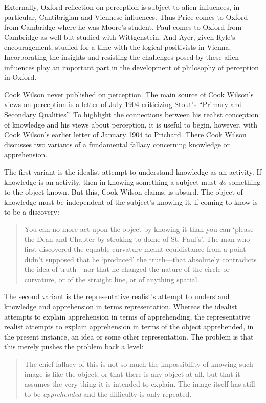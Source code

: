 \documentclass[11pt]{article}
\begin{document}
Externally, Oxford reflection on perception is subject to alien influences, in particular, Cantibrigian and Viennese influences. Thus Price comes to Oxford from Cambridge where he was Moore's student. Paul comes to Oxford from Cambridge as well but studied with Wittgenstein. And Ayer, given Ryle's encouragement, studied for a time with the logical positivists in Vienna. Incorporating the insights and resisting the challenges posed by these alien influences play an important part in the development of philosophy of perception in Oxford.

Cook Wilson never published on perception. The main source of Cook Wilson's \citeyearpar[764--800]{Cook-Wilson:1926sf} views on perception is a letter of July 1904 criticizing Stout's \citeyearpar{Stout:1903zl} ``Primary and Secondary Qualities''. To highlight the connections between his realist conception of knowledge and his views about perception, it is useful to begin, however, with Cook Wilson's \citeyearpar[801--808]{Cook-Wilson:1926sf} earlier letter of January 1904 to Prichard. There Cook Wilson discusses two variants of a fundamental fallacy concerning knowledge or apprehension.

The first variant is the idealist attempt to understand knowledge as an activity. If knowledge is an activity, then in knowing something a subject must \emph{do} something to the object known. But this, Cook Wilson claims, is absurd. The object of knowledge must be independent of the subject's knowing it, if coming to know is to be a discovery: 
\begin{quote}
	You can no more act upon the object by knowing it than you can `please the Dean and Chapter by stroking to dome of St. Paul's'. The man who first discovered the equable curvature meant equidistance from a point didn't supposed that he `produced' the truth---that absolutely contradicts the idea of truth---nor that he changed the nature of the circle or curvature, or of the straight line, or of anything spatial. \citep[802]{Cook-Wilson:1926sf}
\end{quote}

The second variant is the representative realist's attempt to understand knowledge and apprehension in terms representation. Whereas the idealist attempts to explain apprehension in terms of apprehending, the representative realist attempts to explain apprehension in terms of the object apprehended, in the present instance, an idea or some other representation. The problem is that this merely pushes the problem back a level:
\begin{quote}
	The chief fallacy of this is not so much the impossibility of knowing such image is like the object, or that there is any object at all, but that it assumes the very thing it is intended to explain. The image itself has still to be \emph{apprehended} and the difficulty is only repeated. \citep[803]{Cook-Wilson:1926sf}
\end{quote}
\end{document}

